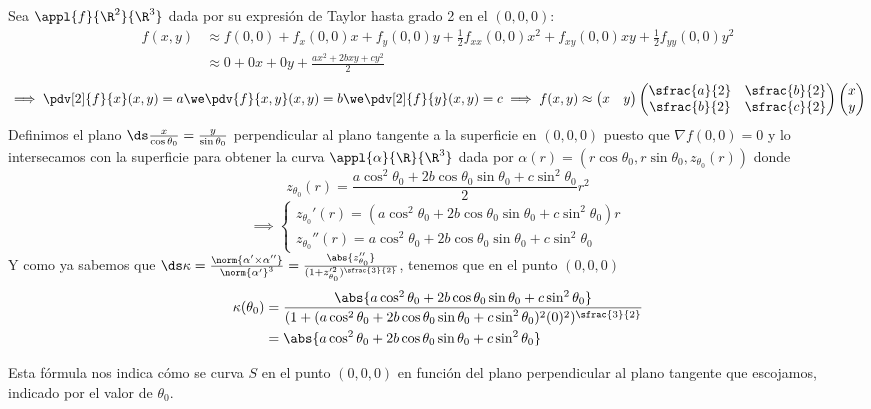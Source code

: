 Sea $\appl{f}{\R^2}{\R^3}$ dada por su expresión de Taylor hasta grado 2 en el $(0,0,0)$:
\[\begin{aligned}
		f(x, y) & \approx f(0,0) + f_x(0,0)x + f_y(0,0)y + \frac{1}{2}f_{xx}(0,0)x^2 + f_{xy}(0,0)xy + \frac{1}{2}f_{yy}(0,0)y^2 \\
		        & \approx 0 + 0x + 0y + \frac{ax^2 + 2bxy + cy^2}{2}
	\end{aligned}\]
\[\implies \pdv[2]{f}{x} (x, y) = a \we \pdv{f}{x, y} (x, y) = b \we \pdv[2]{f}{y} (x, y) = c \implies f(x, y) \approx \begin{pmatrix} x & y \end{pmatrix} \begin{pmatrix}
		\sfrac{a}{2} & \sfrac{b}{2} \\ \sfrac{b}{2} & \sfrac{c}{2}
	\end{pmatrix} \begin{pmatrix}
		x \\ y
	\end{pmatrix}\]
Definimos el plano $\ds \frac{x}{\cos{\theta_0}}=\frac{y}{\sin{\theta_0}}$ perpendicular al plano tangente a la superficie en $(0,0,0)$ puesto que $\nabla f(0,0) = 0$ y lo intersecamos con la superficie para obtener la curva $\appl{\alpha}{\R}{\R^3}$ dada por $\alpha(r) = (r\cos\theta_0, r\sin\theta_0, z_{\theta_0}(r))$ donde
\[z_{\theta_0}(r) = \frac{a\cos^2\theta_0 + 2b\cos\theta_0\sin\theta_0 + c\sin^2\theta_0}{2} r^2\]
\[\implies \begin{cases}
		z_{\theta_0}'(r) = (a\cos^2\theta_0 + 2b\cos\theta_0\sin\theta_0 + c\sin^2\theta_0)r \\
		z_{\theta_0}''(r) = a\cos^2\theta_0 + 2b\cos\theta_0\sin\theta_0 + c\sin^2\theta_0
	\end{cases}\]
Y como ya sabemos que $\ds \kappa = \frac{\norm{\alpha' \times \alpha''}}{\norm{\alpha'}^3} =\frac{\abs{z_{\theta_0}''}}{(1 + z_{\theta_0}'^2)^{\sfrac{3}{2}}}$, tenemos que en el punto $(0,0,0)$
\[\begin{aligned}
		\kappa(\theta_0) & = \frac{\abs{a\cos^2\theta_0 + 2b\cos\theta_0\sin\theta_0 + c\sin^2\theta_0}}{(1 + (a\cos^2\theta_0 + 2b\cos\theta_0\sin\theta_0 + c\sin^2\theta_0)^2(0)^2)^{\sfrac{3}{2}}} \\
		                 & = \abs{a\cos^2\theta_0 + 2b\cos\theta_0\sin\theta_0 + c\sin^2\theta_0}
	\end{aligned}\]

Esta fórmula nos indica cómo se curva $S$ en el punto $(0,0,0)$ en función del plano perpendicular al plano tangente que escojamos, indicado por el valor de $\theta_0$.

